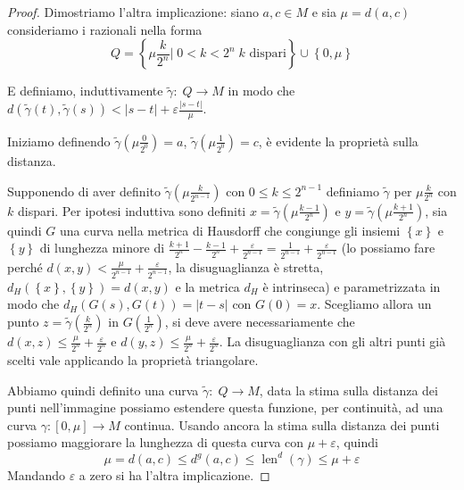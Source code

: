 \documentclass[a4paper,10pt]{article}
\theoremstyle{plain}
\theoremstyle{definition}
\theoremstyle{remark}
\newcommand{\set}[1]{\left\{#1\right\}}
\newcommand{\pa}[1]{\left(#1\right)}
\newcommand{\bra}[1]{\left[#1\right]}
\newcommand{\abs}[1]{\left|#1\right|}
\DeclareMathOperator{\len}{len}
\begin{document}
\begin{proof}
  Dimostriamo l'altra implicazione: siano $a,c\in M$ e sia $\mu =
  d(a,c)$ consideriamo i razionali nella forma
  \[ Q = \set{ \mu \frac{k}{2^n}|\; 0< k <2^n\; k\text{ dispari}} \cup
  \set{0,\mu}\]

  E definiamo, induttivamente $\tilde \gamma:\; Q \to M$ in modo che
  $d(\tilde \gamma (t), \tilde \gamma (s)) < \abs{s-t} + \varepsilon
  \frac{\abs{s-t}}{\mu}$.

  Iniziamo definendo $\tilde\gamma \pa{\mu \frac{0}{2^0}} = a$, $\tilde\gamma
  \pa{\mu \frac{1}{2^0}} = c$, è evidente la proprietà sulla distanza.

  Supponendo di aver definito $\tilde \gamma (\mu \frac{k}{2^{n-1}})$
  con $0 \le k \le 2^{n-1}$ definiamo $\tilde \gamma$ per $\mu
  \frac{k}{2^n}$ con $k$ dispari. Per ipotesi induttiva sono definiti
  $x = \tilde \gamma\pa{\mu \frac{k-1}{2^n}}$ e $y = \tilde
  \gamma\pa{\mu \frac{k+1}{2^n}}$, sia quindi $G$ una curva nella
  metrica di Hausdorff che congiunge gli insiemi $\set{x}$ e $\set{y}$
  di lunghezza minore di $\frac{k+1}{2^n} - \frac{k-1}{2^n} +
  \frac{\varepsilon}{2^{n-1}} = \frac{1}{2^{n-1}} +
  \frac{\varepsilon}{2^{n-1}}$ (lo possiamo fare perché $d\pa{x,y} <
  \frac{\mu}{2^{n-1}} + \frac{\varepsilon}{2^{n-1}}$, la
  disuguaglianza è stretta, $d_H(\set{x},\set{y}) = d(x,y)$ e la
  metrica $d_H$ è intrinseca) e parametrizzata in modo che $d_H(G(s),
  G(t)) = \abs{t-s}$ con $G(0) = x$. Scegliamo allora un punto $z =
  \tilde \gamma \pa{\frac{k}{2^n}}$ in $G\pa{\frac{1}{2^n}}$, si deve
  avere necessariamente che $d(x,z) \le \frac{\mu}{2^n} +
  \frac{\varepsilon}{2^n}$ e $d(y,z) \le \frac{\mu}{2^n} +
  \frac{\varepsilon}{2^n}$. La disuguaglianza con gli altri punti già
  scelti vale applicando la proprietà triangolare.

  Abbiamo quindi definito una curva $\tilde \gamma: \; Q \to M$, data
  la stima sulla distanza dei punti nell'immagine possiamo estendere
  questa funzione, per continuità, ad una curva $\gamma: \bra{0,\mu}
  \to M$ continua. Usando ancora la stima sulla distanza dei punti
  possiamo maggiorare la lunghezza di questa curva con $\mu +
  \varepsilon$, quindi
  \[ \mu = d(a,c) \le d^g(a,c) \le \len^d (\gamma) \le \mu +
  \varepsilon \]
  Mandando $\varepsilon$ a zero si ha l'altra implicazione.
\end{proof}
\end{document}
